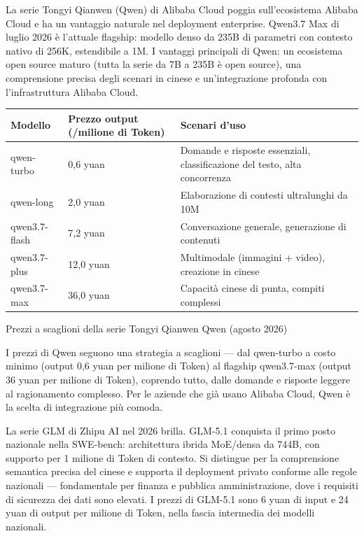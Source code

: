 
La serie Tongyi Qianwen (Qwen) di Alibaba Cloud poggia sull'ecosistema Alibaba Cloud e ha un vantaggio naturale nel deployment enterprise. Qwen3.7 Max di luglio 2026 è l'attuale flagship: modello denso da 235B di parametri con contesto nativo di 256K, estendibile a 1M. I vantaggi principali di Qwen: un ecosistema open source maturo (tutta la serie da 7B a 235B è open source), una comprensione precisa degli scenari in cinese e un'integrazione profonda con l'infrastruttura Alibaba Cloud.

\begin{center}
\begin{tabularx}{\linewidth}{|X|X|X|}
\hline
\textbf{Modello} & \textbf{Prezzo output (/milione di Token)} & \textbf{Scenari d'uso} \tabularnewline
\hline
qwen-turbo & 0,6 yuan & Domande e risposte essenziali, classificazione del testo, alta concorrenza \tabularnewline
qwen-long & 2,0 yuan & Elaborazione di contesti ultralunghi da 10M \tabularnewline
qwen3.7-flash & 7,2 yuan & Conversazione generale, generazione di contenuti \tabularnewline
qwen3.7-plus & 12,0 yuan & Multimodale (immagini + video), creazione in cinese \tabularnewline
qwen3.7-max & 36,0 yuan & Capacità cinese di punta, compiti complessi \tabularnewline
\hline
\end{tabularx}
\end{center}

\begin{center}\small\color{gray}Prezzi a scaglioni della serie Tongyi Qianwen Qwen (agosto 2026)\end{center}

I prezzi di Qwen seguono una strategia a scaglioni — dal qwen-turbo a costo minimo (output 0,6 yuan per milione di Token) al flagship qwen3.7-max (output 36 yuan per milione di Token), coprendo tutto, dalle domande e risposte leggere al ragionamento complesso. Per le aziende che già usano Alibaba Cloud, Qwen è la scelta di integrazione più comoda.


La serie GLM di Zhipu AI nel 2026 brilla. GLM-5.1 conquista il primo posto nazionale nella SWE-bench: architettura ibrida MoE/densa da 744B, con supporto per 1 milione di Token di contesto. Si distingue per la comprensione semantica precisa del cinese e supporta il deployment privato conforme alle regole nazionali — fondamentale per finanza e pubblica amministrazione, dove i requisiti di sicurezza dei dati sono elevati. I prezzi di GLM-5.1 sono 6 yuan di input e 24 yuan di output per milione di Token, nella fascia intermedia dei modelli nazionali.

